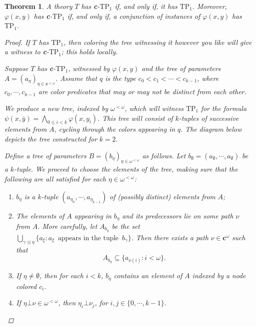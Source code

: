 \documentclass{article}
\newcommand{\TPi}{\text{TP}_1}
\newcommand{\vphi}{\varphi}
\newtheorem{theorem}{Theorem}
\theoremstyle{definition}
\theoremstyle{definition}
\theoremstyle{definition}
\theoremstyle{definition}
\begin{document}
\begin{theorem}{}\label{TP1=cTP1}
    A theory $T$ has \textbf{c}-$\text{TP}_1$ if, and only if, it has $\text{TP}_1$. Moreover, $\vphi(x,y)$ has \textbf{c}-$\TPi$ if, and only if, a conjunction of instances of $\vphi(x,y)$ has $\TPi$.

\begin{proof}
    If $T$ has $\TPi$, then coloring the tree witnessing it however you like will give a witness to \textbf{c}-$\TPi$; this holds locally.
    
    Suppose $T$ has \textbf{c}-$\TPi$, witnessed by $\vphi(x,y)$ and the tree of parameters $A=(a_\eta)_{\eta\in \textbf{c}^{<\omega}}$. Assume that $q$ is the type $c_0<c_1<\dotsm <c_{k-1}$, where $c_0,\dotsm, c_{k-1}$ are color predicates that may or may not be distinct from each other.
    
     We produce a new tree, indexed by $\omega^{<\omega}$, which will witness $\text{TP}_1$ for the formula $\psi(x,\bar{y})=\bigwedge _{0\leq i<k}\vphi(x,y_i)$. This tree will consist of $k$-tuples of successive elements from $A$, cycling through the colors appearing in $q$. The diagram below depicts the tree constructed for $k=2$.
    
    Define a tree of parameters $B=(b_\eta)_{\eta\in\omega^{<\omega}}$ as follows. Let $b_\emptyset=(a_\emptyset,\dotsm, a_\emptyset)$ be a $k$-tuple. We proceed to choose the elements of the tree, making sure that the following are all satisfied for each $\eta\in\omega^{<\omega}$: 

    \begin{enumerate}[label=(\alph*)]
        \item $b_\eta$ is a $k$-tuple $(a_{\eta_0},\dotsm, a_{\eta_{k-1}})$ of (possibly distinct) elements from $A$;

        \item The elements of $A$ appearing in $b_\eta$ and its predecessors lie on some path $\nu$ from $A$. More carefully, let $A_{b_\eta}$ be the set $\bigcup_{\gamma\trianglelefteq\eta}\{a_\xi\colon a_\xi\enspace\text{appears in the tuple}\enspace b_{\gamma}\}$. Then there exists a path $\nu\in\textbf{c}^\omega$ such that $$A_{b_\eta}\subseteq \{a_{\nu(i)}\colon i<\omega\}.$$
    

        \item If $\eta\neq \emptyset$, then for each $i<k$, $b_\eta$ contains an element of $A$ indexed by a node colored $c_i$.

        \item If $\eta\bot\nu\in\omega^{<\omega}$, then $\eta_i\bot\nu_j$, for $i,j\in\{0,\dotsm, k-1\}$.
    \end{enumerate}


\end{proof}
\end{theorem}
\end{document}
